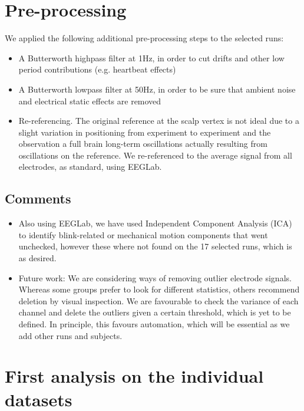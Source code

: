 \documentclass[a4paper]{article}
\begin{document}
\section{Pre-processing}

We applied the following additional pre-processing steps to the selected runs:

\begin{itemize}

\item A Butterworth highpass filter at 1Hz, in order to cut drifts and other low period contributions (e.g. heartbeat effects)
\item A Butterworth lowpass filter at 50Hz, in order to be sure that ambient noise and electrical static effects are removed
\item Re-referencing. The original reference at the scalp vertex is not ideal due to a slight variation in positioning from experiment to experiment and the observation a full brain long-term oscillations actually resulting from oscillations on the reference. We re-referenced to the average signal from all electrodes, as standard, using EEGLab.
\end{itemize}

\subsection{Comments}
\begin{itemize}
\item Also using EEGLab, we have used Independent Component Analysis (ICA) to identify blink-related or mechanical motion components that went unchecked, however these where not found on the 17 selected runs, which is as desired. 

\item Future work: We are considering ways of removing outlier electrode signals. Whereas some groups prefer to look for different statistics, others recommend deletion by visual inspection. We are favourable to check the variance of each channel and delete the outliers given a certain threshold, which is yet to be defined. In principle, this favours automation, which will be essential as we add other runs and subjects.
\end{itemize}



\section{First analysis on the individual datasets}
\end{document}
